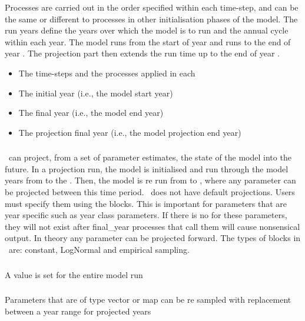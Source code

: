 Processes are carried out in the order specified within each time-step, and can be the same or different to processes in other initialisation phases of the model. The run years define the years over which the model is to run and the annual cycle within each year. The model runs from the start of year  and runs to the end of year . The projection part then extends the run time up to the end of year . 

\begin{itemize}
  \item The time-steps and the processes applied in each
  \item The initial year (i.e., the model start year)
  \item The final year (i.e., the model end year)
  \item The projection final year (i.e., the model projection end year)
\end{itemize}

\subsubsection{\label{sec:projections}}

\CNAME\ can project, from a set of parameter estimates, the state of the model into the future. In a projection run, the model is initialised and run through the model years from  to the . Then, the model is re run from  to , where any parameter can be projected between this time period. \CNAME\ does not have default projections. Users must specify them using the  blocks. This is important for parameters that are year specific such as year class parameters. If there is no  for these parameters, they will not exist after final\_year processes that call them will cause nonsensical output. In theory any parameter can be projected forward. The types of  blocks in \CNAME\ are: constant, LogNormal and empirical sampling.

\subsubsection*{}
A value is set for the entire model run
\subsubsection*{}
Parameters that are of type vector or map can be re sampled with replacement between a year range for projected years
